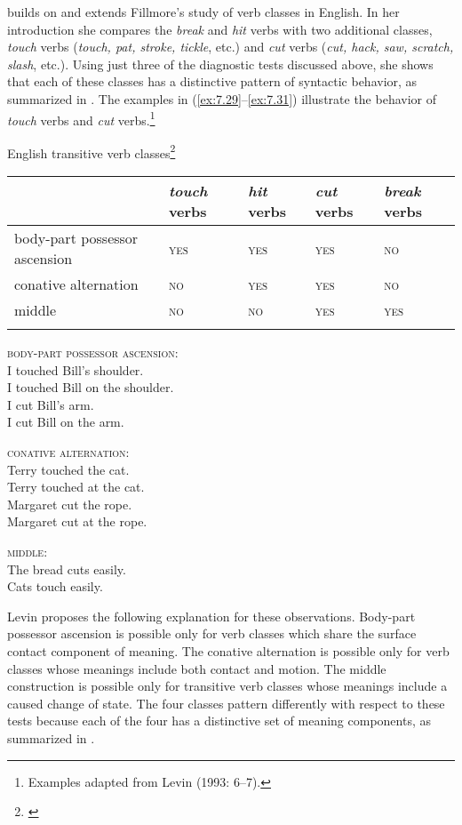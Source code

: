 \citet{Levin1993} builds on and extends Fillmore’s study of verb classes in English. In her introduction she compares the \textit{break} and \textit{hit} verbs with two additional classes, \textit{touch} verbs (\textit{touch, pat, stroke, tickle}, etc.) and \textit{cut} verbs (\textit{cut, hack, saw, scratch, slash}, etc.). Using just three of the diagnostic tests discussed above, she shows that each of these classes has a distinctive pattern of syntactic behavior, as summarized in . The examples in (\ref{ex:7.29}--\ref{ex:7.31}) illustrate the behavior of \textit{touch} verbs and \textit{cut} verbs.\footnote{Examples adapted from Levin (1993: 6–7).}


\ea English transitive verb classes\footnote{\citet[8]{Levin1993}}\\
\begin{tabularx}{\textwidth}{XXXXX} 
\lsptoprule
& \textit{touch} verbs & \textit{hit} verbs & \textit{cut} verbs & \textit{break} verbs\\\midrule
body-part possessor ascension & \scshape yes & \scshape yes & \scshape yes & \scshape no\\
conative alternation & \scshape no & \scshape yes & \scshape yes & \scshape no\\
middle & \scshape no & \scshape no & \scshape yes & \scshape yes\\
\lspbottomrule
\end{tabularx}
\z

\ea \label{ex:7.29}
\textsc{body-part possessor ascension}:\\
\ea  I touched Bill’s shoulder.\\
\ex  I touched Bill on the shoulder.\\
\ex  I cut Bill’s arm.\\
\ex  I cut Bill on the arm.
                       \z
\z

\ea \label{ex:7.39}  \textsc{conative alternation}:\\
\ea  Terry touched the cat.\\
\ex *Terry touched at the cat.\\
\ex  Margaret cut the rope.\\
\ex  Margaret cut at the rope.
                       \z
\z

\ea \label{ex:7.31}
\textsc{middle}:\\
\ea  The bread cuts easily.\\
\ex *Cats touch easily.
                       \z
\z


Levin proposes the following explanation for these observations. Body-part possessor ascension is possible only for verb classes which share the surface contact component of meaning. The conative alternation is possible only for verb classes whose meanings include both contact and motion. The middle construction is possible only for transitive verb classes whose meanings include a caused change of state. The four classes pattern differently with respect to these tests because each of the four has a distinctive set of meaning components, as summarized in .



